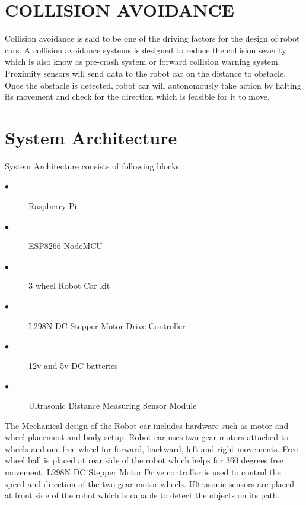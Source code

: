 \documentclass[sigconf]{acmart}
\begin{document}
\section{COLLISION AVOIDANCE}
Collision avoidance is said to be one of the driving factors for the design of robot cars. A collision avoidance systems is designed to reduce the collision severity which is also know as pre-crash system or forward collision warning system. Proximity sensors will send data to the robot car on the distance to obstacle. Once the obstacle is detected, robot  car will autonomously take action by halting its movement and check for the direction which is feasible for it to move. 

\section{System Architecture}
System Architecture consists of following blocks :
\begin{description}
    \item[$\bullet$] Raspberry Pi

    \item[$\bullet$] ESP8266 NodeMCU 

    \item[$\bullet$] 3 wheel Robot Car kit

    \item[$\bullet$] L298N DC Stepper Motor Drive Controller 

    \item[$\bullet$] 12v and 5v DC batteries
    
    \item[$\bullet$] Ultrasonic Distance Measuring Sensor Module 
    
\end{description}

The Mechanical design of the Robot car includes hardware such as motor and wheel placement and body setup. Robot car uses two gear-motors attached to wheels and one free wheel for forward, backward, left and right movements. Free wheel ball is placed at rear side of the robot which helps for 360 degrees free movement. L298N DC Stepper Motor Drive controller is used to control the speed and direction of the two gear motor wheels. Ultrasonic sensors are placed at front side of the robot which is capable to detect the objects on its path.
\end{document}
